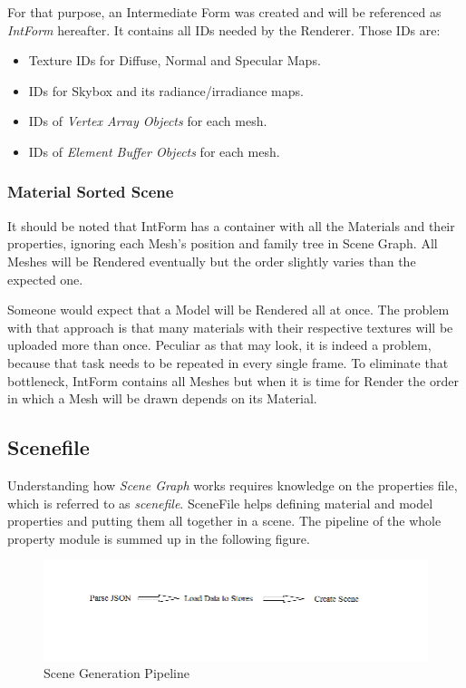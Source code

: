 For that purpose, an Intermediate Form was created and will be referenced as \textit{IntForm} hereafter. It contains
all IDs needed by the Renderer. Those IDs are:

\begin{itemize}
\item Texture IDs for Diffuse, Normal and Specular Maps.
\item IDs for Skybox and its radiance/irradiance maps.
\item IDs of \textit{Vertex Array Objects} for each mesh. 
\item IDs of \textit{Element Buffer Objects} for each mesh.
\end{itemize}

\subsubsection{Material Sorted Scene}
It should be noted that IntForm has a container with all the Materials and their properties, ignoring each Mesh's
position and family tree in Scene Graph. All Meshes will be Rendered eventually but the order slightly varies than
the expected one.

Someone would expect that a Model will be Rendered all at once. The problem with that approach is that many materials
with their respective textures will be uploaded more than once. Peculiar as that may look, it is indeed a problem,
because that task needs to be repeated in every single frame. To eliminate that bottleneck, IntForm contains all
Meshes but when it is time for Render the order in which a Mesh will be drawn depends on its Material.

\subsection{Scenefile}
Understanding how \textit{Scene Graph} works requires knowledge on the properties file, which is referred to as
\textit{scenefile}. SceneFile helps defining material and model properties and putting them all together in a scene.
The pipeline of the whole property module is summed up in the following figure.

\begin{figure}[h]
    \centering
    \includegraphics[scale=0.5, clip=true, trim=0 80 0 20]{./image/scene_pipeline.png}
    \caption{Scene Generation Pipeline}
\end{figure}

